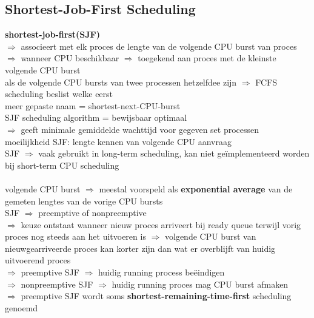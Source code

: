 \documentclass{report}
\begin{document}
\subsection{Shortest-Job-First Scheduling}
\textbf{shortest-job-first(SJF)}
\\$\Rightarrow$ associeert met elk proces de lengte van de volgende CPU burst van proces
\\$\Rightarrow$ wanneer CPU beschikbaar $\Rightarrow$ toegekend aan proces met de kleinste volgende CPU burst
\\als de volgende CPU bursts van twee processen hetzelfdee zijn $\Rightarrow$ FCFS scheduling beslist welke eerst
\\meer gepaste naam = shortest-next-CPU-burst
\\SJF scheduling algorithm = bewijsbaar optimaal
\\$\Rightarrow$ geeft minimale gemiddelde wachttijd voor gegeven set processen 
\\moeilijkheid SJF: lengte kennen van volgende CPU aanvraag
\\SJF $\Rightarrow$ vaak gebruikt in long-term scheduling, kan niet ge\"implementeerd worden bij short-term CPU scheduling
\\
\\volgende CPU burst $\Rightarrow$ meestal voorspeld als \textbf{exponential average} van de gemeten lengtes van de vorige CPU bursts
\\ SJF $\Rightarrow$ preemptive of nonpreemptive
\\$\Rightarrow$ keuze ontstaat wanneer nieuw proces arriveert bij ready queue terwijl vorig proces nog steeds aan het uitvoeren is $\Rightarrow$ volgende CPU burst van nieuwgearriveerde proces kan korter zijn dan wat er overblijft van huidig uitvoerend proces
\\$\Rightarrow$ preemptive SJF $\Rightarrow$ huidig running process be\"eindigen 
\\$\Rightarrow$ nonpreemptive SJF $\Rightarrow$ huidig running proces mag CPU burst afmaken
\\$\Rightarrow$ preemptive SJF wordt soms \textbf{shortest-remaining-time-first} scheduling genoemd
\end{document}
